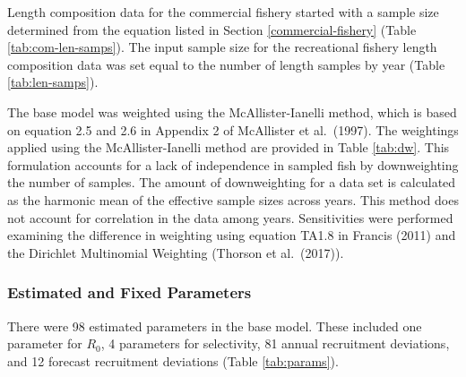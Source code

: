 \documentclass[11pt,
  english,
  letterpaper,
]{article}
\begin{document}

Length composition data for the commercial fishery started with a sample size determined from the equation listed in Section \ref{commercial-fishery} (Table \ref{tab:com-len-samps}). The input sample size for the recreational fishery length composition data was set equal to the number of length samples by year (Table \ref{tab:len-samps}).

\leavevmode\tagmcend\tagstructend\par


The base model was weighted using the McAllister-Ianelli method, which is based on equation 2.5 and 2.6 in Appendix 2 of McAllister et al.~{(1997)\leavevmode\tagmcend\tagstructend}. The weightings applied using the McAllister-Ianelli method are provided in Table \ref{tab:dw}. This formulation accounts for a lack of independence in sampled fish by downweighting the number of samples. The amount of downweighting for a data set is calculated as the harmonic mean of the effective sample sizes across years. This method does not account for correlation in the data among years. Sensitivities were performed examining the difference in weighting using equation TA1.8 in Francis {(2011)\leavevmode\tagmcend\tagstructend} and the Dirichlet Multinomial Weighting (Thorson et al.~{(2017)\leavevmode\tagmcend\tagstructend}).

\leavevmode\tagmcend\tagstructend\par


\hypertarget{estimated-and-fixed-parameters}{%
\subsubsection{Estimated and Fixed Parameters}\label{estimated-and-fixed-parameters}}

\leavevmode\tagmcend\tagstructend


There were 98 estimated parameters in the base model. These included one parameter for {\(R_0\)\leavevmode\tagmcend\tagstructend}, 4 parameters for selectivity, 81 annual recruitment deviations, and 12 forecast recruitment deviations (Table \ref{tab:params}).
\end{document}

